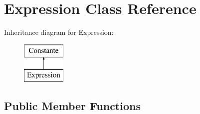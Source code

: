 \hypertarget{class_expression}{\section{Expression Class Reference}
\label{class_expression}
}
Inheritance diagram for Expression\-:\begin{figure}[H]
\begin{center}
\leavevmode
\includegraphics[height=2.000000cm]{class_expression}
\end{center}
\end{figure}
\subsection*{Public Member Functions}
